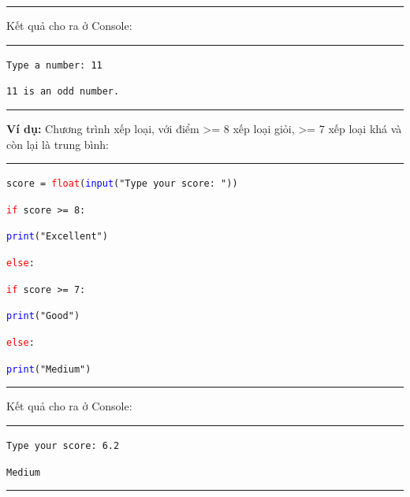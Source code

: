 \rule{\linewidth}{0.2mm}\par
\noindent
\resetlinenumber
Kết quả cho ra ở Console:\\
\rule{\linewidth}{0.2mm}\par
\begin{linenumbers}
	\texttt{Type a number: 11}\par
	\texttt{11 is an odd number.}
\end{linenumbers}
\rule{\linewidth}{0.2mm}\par
\resetlinenumber
\newpage
\textbf{Ví dụ:} Chương trình xếp loại, với điểm >= 8 xếp loại giỏi, >= 7 xếp loại khá và còn lại là trung bình:\\
\rule{\linewidth}{0.2mm}\par
\begin{linenumbers}
	\texttt{score = \textcolor{red}{float}(\textcolor{blue}{input}("Type your score: "))}\par
	\texttt{\textcolor{red}{if} score >= 8:}\par
	\qquad \texttt{\textcolor{blue}{print}("Excellent")}\par
	\texttt{\textcolor{red}{else}:}\par
	\qquad \texttt{\textcolor{red}{if} score >= 7:}\par
	\qquad \qquad \texttt{\textcolor{blue}{print}("Good")}\par
	\qquad \texttt{\textcolor{red}{else}:}\par
	\qquad \qquad \texttt{\textcolor{blue}{print}("Medium")}\par
\end{linenumbers}
\rule{\linewidth}{0.2mm}\par
\noindent
\resetlinenumber
Kết quả cho ra ở Console:\\
\rule{\linewidth}{0.2mm}\par
\begin{linenumbers}
	\texttt{Type your score: 6.2}\par
	\texttt{Medium}
\end{linenumbers}
\rule{\linewidth}{0.2mm}\par
\resetlinenumber
\newpage